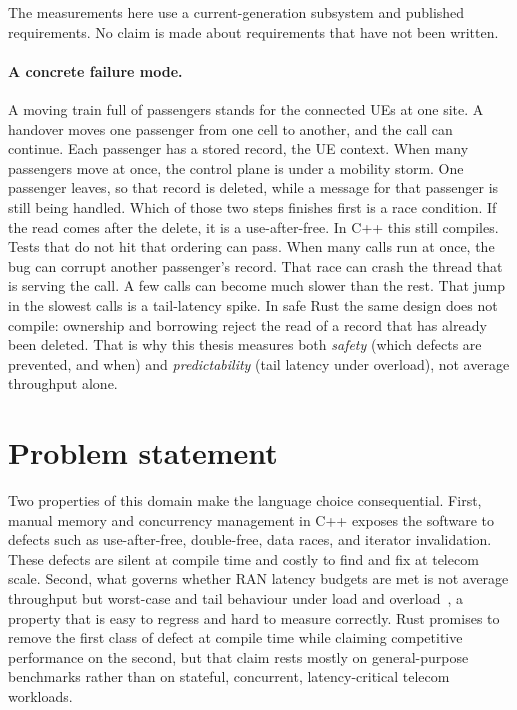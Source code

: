 \documentclass[english,oneside,a4paper,censored,csm,software-track-2020]{HYthesisML}
\begin{document}
The measurements here use a current-generation subsystem and published requirements.
No claim is made about requirements that have not been written.

\paragraph{A concrete failure mode.}
A moving train full of passengers stands for the connected UEs at one site.
A handover moves one passenger from one cell to another, and the call can
continue. Each passenger has a stored record, the UE context. When many
passengers move at once, the control plane is under a mobility storm. One
passenger leaves, so that record is deleted, while a message for that
passenger is still being handled. Which of those two steps finishes first is a
race condition. If the read comes after the delete, it is a use-after-free.
In C++ this still compiles. Tests that do not hit that ordering can pass.
When many calls run at once, the bug can corrupt another passenger's record.
That race can crash the thread that is serving the call. A few calls can
become much slower than the rest. That jump in the slowest calls is a
tail-latency spike. In safe
Rust the same design does not compile: ownership and borrowing reject the read
of a record that has already been deleted. That is why this thesis measures
both \emph{safety} (which defects are prevented, and when) and
\emph{predictability} (tail latency under overload), not average throughput
alone.

\section{Problem statement}
Two properties of this domain make the language choice consequential. First, manual memory and
concurrency management in C++ exposes the software to defects such as use-after-free,
double-free, data races, and iterator invalidation. These defects are silent at compile time and
costly to find and fix at telecom scale. Second, what governs whether RAN latency budgets are met is not
average throughput but worst-case and tail behaviour under load and
overload~\cite{dean2013tail}, a property that is easy to regress and hard to measure correctly.
Rust promises to remove the first class of defect at compile time while claiming competitive
performance on the second, but that claim rests mostly on general-purpose benchmarks rather
than on stateful, concurrent, latency-critical telecom workloads.
\end{document}
